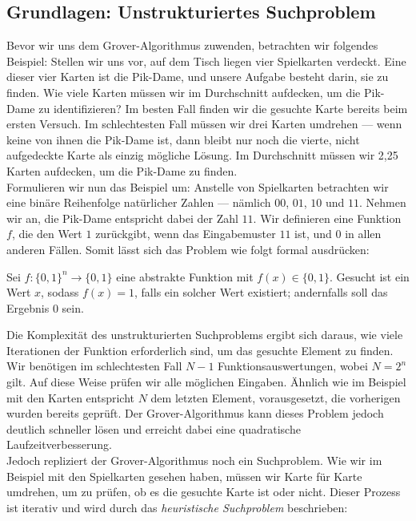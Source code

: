 \subsection{Grundlagen: Unstrukturiertes Suchproblem}
Bevor wir uns dem Grover-Algorithmus zuwenden, betrachten wir folgendes Beispiel: Stellen wir uns vor, auf dem Tisch liegen vier Spielkarten verdeckt. Eine dieser vier Karten ist die Pik-Dame, und unsere Aufgabe besteht darin, sie zu finden. Wie viele Karten müssen wir im Durchschnitt aufdecken, um die Pik-Dame zu identifizieren? Im besten Fall finden wir die gesuchte Karte bereits beim ersten Versuch. Im schlechtesten Fall müssen wir drei Karten umdrehen — wenn keine von ihnen die Pik-Dame ist, dann bleibt nur noch die vierte, nicht aufgedeckte Karte als einzig mögliche Lösung. Im Durchschnitt müssen wir 2{,}25 Karten aufdecken, um die Pik-Dame zu finden.\\

Formulieren wir nun das Beispiel um: Anstelle von Spielkarten betrachten wir eine binäre Reihenfolge natürlicher Zahlen — nämlich $00$, $01$, $10$ und $11$. Nehmen wir an, die Pik-Dame entspricht dabei der Zahl $11$. Wir definieren eine Funktion $f$, die den Wert $1$ zurückgibt, wenn das Eingabemuster $11$ ist, und $0$ in allen anderen Fällen. Somit lässt sich das Problem wie folgt formal ausdrücken:

\begin{definition}
Sei $f\colon \{0, 1\}^n \rightarrow \{0, 1\}$ eine abstrakte Funktion mit $f(x) \in \{0, 1\}$. Gesucht ist ein Wert $x$, sodass $f(x) = 1$, falls ein solcher Wert existiert; andernfalls soll das Ergebnis $0$ sein.
\end{definition}

Die Komplexität des unstrukturierten Suchproblems ergibt sich daraus, wie viele Iterationen der Funktion erforderlich sind, um das gesuchte Element zu finden. Wir benötigen im schlechtesten Fall $N - 1$ Funktionsauswertungen, wobei $N = 2^n$ gilt. Auf diese Weise prüfen wir alle möglichen Eingaben. Ähnlich wie im Beispiel mit den Karten entspricht $N$ dem letzten Element, vorausgesetzt, die vorherigen wurden bereits geprüft. Der Grover-Algorithmus kann dieses Problem jedoch deutlich schneller lösen und erreicht dabei eine quadratische Laufzeitverbesserung.\\

Jedoch repliziert der Grover-Algorithmus noch ein Suchproblem. Wie wir im Beispiel mit den Spielkarten gesehen haben, müssen wir Karte für Karte umdrehen, um zu prüfen, ob es die gesuchte Karte ist oder nicht. Dieser Prozess ist iterativ und wird durch das \textit{heuristische Suchproblem} beschrieben:

